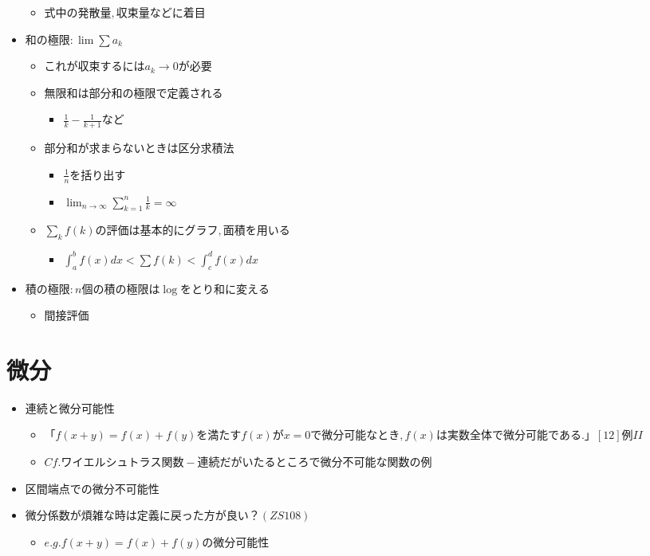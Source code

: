 \documentclass[dvipdfmx,uplatex]{jsarticle}
\begin{document}
\begin{itemize}
\begin{itemize}
		\item $ 式中の発散量,収束量などに着目$
	\end{itemize}
	\item $ 和の極限: \lim \sum a_k$
	\begin{itemize}
		\item $ これが収束するには a_k \to 0 が必要$
		\item $ 無限和は部分和の極限で定義される$
		\begin{itemize}
			\item $ \frac{1}{k} - \frac{1}{k+1} など$
		\end{itemize}
		\item $ 部分和が求まらないときは区分求積法$
		\begin{itemize}
			\item $ \frac{1}{n}を括り出す$
			\item $ \lim_{n \to \infty} \sum^n_{k = 1} \frac{1}{k} = \infty$
		\end{itemize}
		\item $ \sum_k f(k) の評価は基本的にグラフ,面積を用いる$
		\begin{itemize}
			\item $ \int^b_a f(x)dx < \sum f(k) < \int^d_c f(x)dx$
		\end{itemize}
	\end{itemize}
	\item $ 積の極限: n個の積の極限は \log をとり和に変える$
	\begin{itemize}
		\item $ 間接評価$
	\end{itemize}
\end{itemize}

\section{微分}
\begin{itemize}
	\item $ 連続と微分可能性$
	\begin{itemize}
		\item $ 「f(x + y) = f(x) + f(y)を満たす f(x) が x = 0 で微分可能なとき, f(x) は実数全体で微分可能である.」[12]例II$
		\item $ Cf. ワイエルシュトラス関数 - 連続だがいたるところで微分不可能な関数の例$
	\end{itemize}
	\item $ 区間端点での微分不可能性$
	\item $ 微分係数が煩雑な時は定義に戻った方が良い？(ZS108)$
	\begin{itemize}
		\item $ e.g. f(x+y) = f(x) + f(y) の微分可能性$
	\end{itemize}
\end{itemize}
\end{document}
